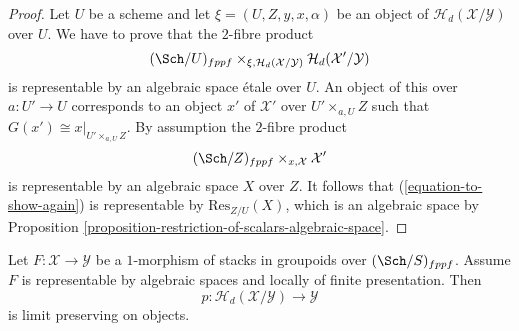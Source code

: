 \begin{proof}
Let $U$ be a scheme and let $\xi = (U, Z, y, x, \alpha)$ be an object of
$\mathcal{H}_d(\mathcal{X}/\mathcal{Y})$ over $U$.
We have to prove that the $2$-fibre product
\begin{equation}
\label{equation-to-show-again}
(\Sch/U)_{fppf}
\times_{\xi, \mathcal{H}_d(\mathcal{X}/\mathcal{Y})}
\mathcal{H}_d(\mathcal{X}'/\mathcal{Y})
\end{equation}
is representable by an algebraic space \'etale over $U$.
An object of this over $a : U' \to U$ corresponds to an object
$x'$ of $\mathcal{X}'$ over $U' \times_{a, U} Z$ such that
$G(x') \cong x|_{U' \times_{a, U} Z}$. By assumption the $2$-fibre product
$$
(\Sch/Z)_{fppf} \times_{x, \mathcal{X}} \mathcal{X}'
$$
is representable by an algebraic space $X$ over $Z$. It follows that
(\ref{equation-to-show-again}) is representable by $\text{Res}_{Z/U}(X)$,
which is an algebraic space by
Proposition \ref{proposition-restriction-of-scalars-algebraic-space}.
\end{proof}

\begin{lemma}
\label{lemma-limit-preserving}
Let $F : \mathcal{X} \to \mathcal{Y}$ be a $1$-morphism of stacks in groupoids
over $(\Sch/S)_{fppf}$. Assume $F$ is representable by algebraic
spaces and locally of finite presentation. Then
$$
p : \mathcal{H}_d(\mathcal{X}/\mathcal{Y}) \to \mathcal{Y}
$$
is limit preserving on objects.
\end{lemma}

